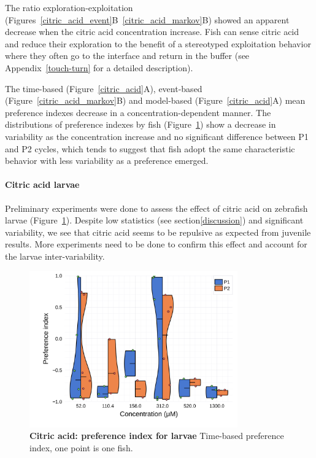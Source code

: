   The ratio exploration-exploitation (Figures~\ref{citric_acid_event}B~\ref{citric_acid_markov}B) showed an apparent decrease when the citric acid concentration increase. Fish can sense citric acid and reduce their exploration to the benefit of a stereotyped exploitation behavior where they often go to the interface and return in the buffer (see Appendix~\ref{touch-turn} for a detailed description).

  The time-based (Figure~\ref{citric_acid}A), event-based (Figure~\ref{citric_acid_markov}B) and model-based (Figure~\ref{citric_acid}A) mean preference indexes decrease in a concentration-dependent manner. The distributions of preference indexes by fish (Figure~\ref{dist_citric_acid}) show a decrease in variability as the concentration increase and no significant difference between P1 and P2 cycles, which tends to suggest that fish adopt the same characteristic behavior with less variability as a preference emerged.

  \paragraph{Citric acid larvae} Preliminary experiments were done to assess the effect of citric acid on zebrafish larvae (Figure~\ref{dist_citric_acid}). Despite low statistics (see section\ref{discussion}) and significant variability, we see that citric acid seems to be repulsive as expected from juvenile results. More experiments need to be done to confirm this effect and account for the larvae inter-variability.
    \begin{figure}[h!]
      \centering
      \includegraphics[width=0.8\textwidth]{part_2/assets/dist_citricacid_lar.png}
      \caption{\textbf{Citric acid: preference index for larvae} Time-based preference index, one point is one fish.}
      \label{dist_citric_acid}
    \end{figure}

